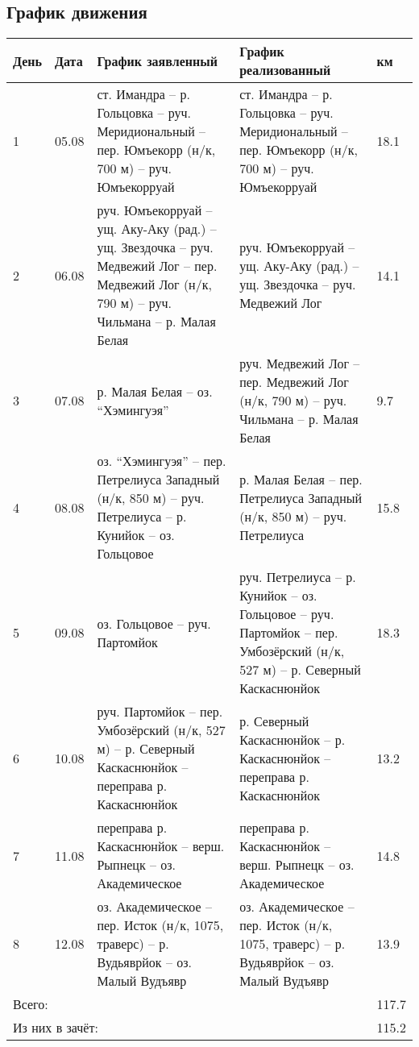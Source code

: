 \subsection{График движения}
\begin{longtable}{|l|l|p{6cm}|p{6cm}|l|}
    \hline
    День & Дата & График заявленный & График реализованный & км\\
    \hline
    1 &
    05.08 &
    ст. Имандра -- р. Гольцовка -- руч. Меридиональный -- пер. Юмъекорр (н/к, 700 м) -- руч. Юмъекорруай &
    ст. Имандра -- р. Гольцовка -- руч. Меридиональный -- пер. Юмъекорр (н/к, 700 м) -- руч. Юмъекорруай &
    18.1
    \\
    \hline
    2 &
    06.08 &
    руч. Юмъекорруай -- ущ. Аку-Аку (рад.) -- ущ. Звездочка -- руч. Медвежий Лог -- пер. Медвежий Лог (н/к, 790 м)
    -- руч. Чильмана -- р. Малая Белая &
    руч. Юмъекорруай -- ущ. Аку-Аку (рад.) -- ущ. Звездочка -- руч. Медвежий Лог &
    14.1
    \\
    \hline
    3 &
    07.08 &
    р. Малая Белая -- оз. \enquote{Хэмингуэя} &
    руч. Медвежий Лог -- пер. Медвежий Лог (н/к, 790 м) -- руч. Чильмана -- р. Малая Белая &
    9.7
    \\
    \hline
    4 &
    08.08 &
    оз. \enquote{Хэмингуэя} -- пер. Петрелиуса Западный (н/к, 850 м) -- руч. Петрелиуса -- р. Кунийок -- оз. Гольцовое &
    р. Малая Белая -- пер. Петрелиуса Западный (н/к, 850 м) -- руч. Петрелиуса &
    15.8
    \\
    \hline
    5 &
    09.08 &
    оз. Гольцовое -- руч. Партомйок &
    руч. Петрелиуса -- р. Кунийок -- оз. Гольцовое  -- руч. Партомйок -- пер. Умбозёрский (н/к, 527 м) -- р. Северный Каскаснюнйок &
	18.3
    \\
    \hline
    6 &
    10.08 &
    руч. Партомйок -- пер. Умбозёрский (н/к, 527 м) -- р. Северный Каскаснюнйок -- переправа р. Каскаснюнйок &
    р. Северный Каскаснюнйок -- р. Каскаснюнйок -- переправа р. Каскаснюнйок &
	13.2
    \\
    \hline
    7 &
    11.08 &
    переправа р. Каскаснюнйок -- верш. Рыпнецк -- оз. Академическое &
    переправа р. Каскаснюнйок -- верш. Рыпнецк -- оз. Академическое &
	14.8
    \\
    \hline
    8 &
    12.08 &
    оз. Академическое -- пер. Исток (н/к, 1075, траверс) -- р. Вудьяврйок -- оз. Малый Вудъявр &
    оз. Академическое -- пер. Исток (н/к, 1075, траверс) -- р. Вудьяврйок -- оз. Малый Вудъявр &
	13.9
    \\
    \hline
    \multicolumn{4}{|l|}{Всего:} &
	117.7
    \\
    \multicolumn{4}{|l|}{Из них в зачёт:} &
    115.2
    \\
    \hline
\end{longtable}

